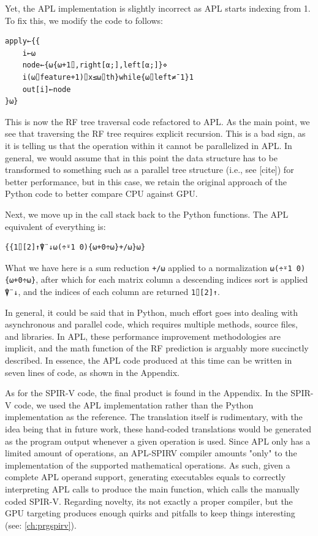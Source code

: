 \documentclass{IEEEtran}
\begin{document}
Yet, the APL implementation is slightly incorrect as APL starts indexing from 1. To fix this, we modify the code to follows:

{\aplfont\begin{verbatim}
apply←{{
    i←⍵
    node←{⍵{⍵+1⌷,right[⍺;],left[⍺;]}⋄
    i(⍵⌷feature+1)⌷x≤⍵⌷th}while{⍵⌷left≠¯1}1
    out[i]←node
}⍵}
\end{verbatim}}

This is now the RF tree traversal code refactored to APL. As the main point, we see that traversing the RF tree requires explicit recursion. This is a bad sign, as it is telling us that the operation within it cannot be parallelized in APL. In general, we would assume that in this point the data structure has to be transformed to something such as a parallel tree structure (i.e., see [cite]) for better performance, but in this case, we retain the original approach of the Python code to better compare CPU against GPU.

Next, we move up in the call stack back to the Python functions. The APL equivalent of everything is:

{\aplfont\begin{verbatim}
{{1⌷[2]↑⍒¨↓⍵(÷⍤1 0){⍵+0÷⍵}+/⍵}⍵}
\end{verbatim}}

What we have here is a sum reduction \verb|+/⍵| applied to a normalization \verb|⍵(÷⍤1 0){⍵+0÷⍵}|, after which for each matrix column a descending indices sort is applied \verb|⍒¨↓|, and the indices of each column are returned \verb|1⌷[2]↑|.

In general, it could be said that in Python, much effort goes into dealing with asynchronous and parallel code, which requires multiple methods, source files, and libraries. In APL, these performance improvement methodologies are implicit, and the math function of the RF prediction is arguably more succinctly described. In essence, the APL code produced at this time can be written in seven lines of code, as shown in the Appendix.

As for the SPIR-V code, the final product is found in the Appendix. In the SPIR-V code, we used the APL implementation rather than the Python implementation as the reference. The translation itself is rudimentary, with the idea being that in future work, these hand-coded translations would be generated as the program output whenever a given operation is used. Since APL only has a limited amount of operations, an APL-SPIRV compiler amounts "only" to the implementation of the supported mathematical operations. As such, given a complete APL operand support, generating executables equals to correctly interpreting APL calls to produce the main function, which calls the manually coded SPIR-V. Regarding novelty, its not exactly a proper compiler, but the GPU targeting produces enough quirks and pitfalls to keep things interesting (see: \ref{ch:prgspirv}).
\end{document}
